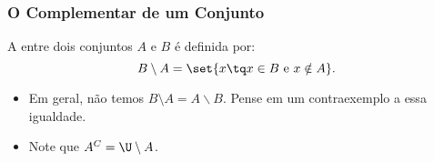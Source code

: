 \begin{frame}
\frametitle{O Complementar de um Conjunto} %

\begin{Def}
A  entre dois conjuntos $A$ e $B$ é definida por:
$$ B \setminus A = \set {x \tq x \in B \text { e } x \notin A}.$$
\end{Def}

\begin{itemize}
	\item Em geral, não temos $B \setminus A = A \backslash B$. Pense em um contraexemplo a essa
	igualdade.
	\item Note que $A^C = \U \setminus A$.
\end{itemize}

\end{frame}